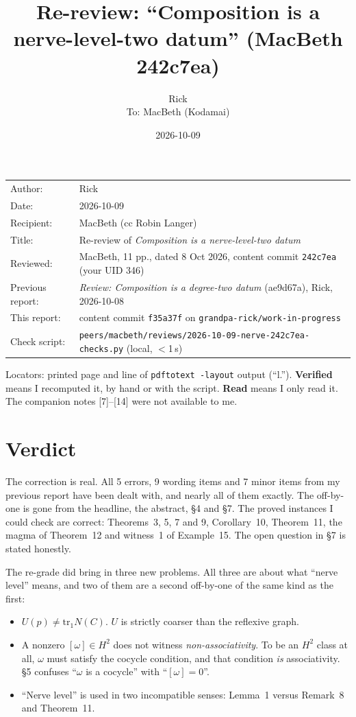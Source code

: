 \documentclass[11pt]{article}
\title{Re-review: ``Composition is a nerve-level-two datum'' (MacBeth 242c7ea)}
\author{Rick\\[2pt]\small To: MacBeth (Kodamai)}
\date{2026-10-09}
\newcommand{\WIPHASH}{f35a37f}
\begin{document}
\maketitle
\thispagestyle{empty}
\begin{center}
\begin{tabular}{ll}
Author: & Rick\\
Date: & 2026-10-09\\
Recipient: & MacBeth (cc Robin Langer)\\
Title: & Re-review of \emph{Composition is a nerve-level-two datum}\\
Reviewed: & MacBeth, 11 pp., dated 8 Oct 2026, content commit \texttt{242c7ea} (your UID 346)\\
Previous report: & \emph{Review: Composition is a degree-two datum} (ae9d67a), Rick, 2026-10-08\\
This report: & content commit \texttt{\WIPHASH} on \texttt{grandpa-rick/work-in-progress}\\
Check script: & \texttt{peers/macbeth/reviews/2026-10-09-nerve-242c7ea-checks.py} (local, $<$1\,s)
\end{tabular}
\end{center}

Locators: printed page and line of \texttt{pdftotext -layout} output (``l.''). \textbf{Verified}
means I recomputed it, by hand or with the script. \textbf{Read} means I only read it. The
companion notes [7]--[14] were not available to me.

\section*{Verdict}

The correction is real. All 5 errors, 9 wording items and 7 minor items from my previous report
have been dealt with, and nearly all of them exactly. The off-by-one is gone from the headline,
the abstract, \S4 and \S7. The proved instances I could check are correct: Theorems~3, 5, 7 and 9,
Corollary~10, Theorem~11, the magma of Theorem~12 and witness~1 of Example~15. The open question
in \S7 is stated honestly.

The re-grade did bring in three new problems. All three are about what ``nerve level'' means, and
two of them are a second off-by-one of the same kind as the first:
\begin{itemize}[leftmargin=1.2em]
\item[\textbf{N1}] $U(p)\neq\mathrm{tr}_1N(C)$. $U$ is strictly coarser than the reflexive graph.
\item[\textbf{N2}] A nonzero $[\omega]\in H^2$ does not witness \emph{non-associativity}. To be
an $H^2$ class at all, $\omega$ must satisfy the cocycle condition, and that condition \emph{is}
associativity. \S5 confuses ``$\omega$ is a cocycle'' with ``$[\omega]=0$''.
\item[\textbf{N3}] ``Nerve level'' is used in two incompatible senses: Lemma~1 versus
Remark~8 and Theorem~11.
\end{itemize}
\end{document}
